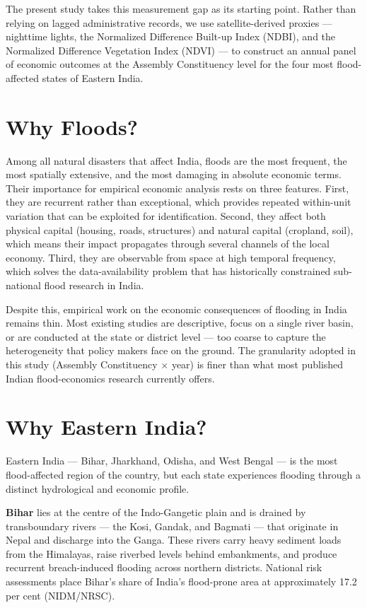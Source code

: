 \documentclass[12pt,a4paper,oneside]{report}
\begin{document}
The present study takes this measurement gap as its starting point. Rather than relying on lagged administrative records, we use satellite-derived proxies --- nighttime lights, the Normalized Difference Built-up Index (NDBI), and the Normalized Difference Vegetation Index (NDVI) --- to construct an annual panel of economic outcomes at the Assembly Constituency level for the four most flood-affected states of Eastern India.

\section{Why Floods?}
Among all natural disasters that affect India, floods are the most frequent, the most spatially extensive, and the most damaging in absolute economic terms. Their importance for empirical economic analysis rests on three features. First, they are recurrent rather than exceptional, which provides repeated within-unit variation that can be exploited for identification. Second, they affect both physical capital (housing, roads, structures) and natural capital (cropland, soil), which means their impact propagates through several channels of the local economy. Third, they are observable from space at high temporal frequency, which solves the data-availability problem that has historically constrained sub-national flood research in India.

Despite this, empirical work on the economic consequences of flooding in India remains thin. Most existing studies are descriptive, focus on a single river basin, or are conducted at the state or district level --- too coarse to capture the heterogeneity that policy makers face on the ground. The granularity adopted in this study (Assembly Constituency $\times$ year) is finer than what most published Indian flood-economics research currently offers.

\section{Why Eastern India?}
Eastern India --- Bihar, Jharkhand, Odisha, and West Bengal --- is the most flood-affected region of the country, but each state experiences flooding through a distinct hydrological and economic profile.

\textbf{Bihar} lies at the centre of the Indo-Gangetic plain and is drained by transboundary rivers --- the Kosi, Gandak, and Bagmati --- that originate in Nepal and discharge into the Ganga. These rivers carry heavy sediment loads from the Himalayas, raise riverbed levels behind embankments, and produce recurrent breach-induced flooding across northern districts. National risk assessments place Bihar's share of India's flood-prone area at approximately 17.2 per cent (NIDM/NRSC).
\end{document}
